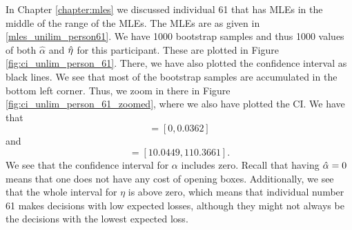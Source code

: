In Chapter \ref{chapter:mles} we discussed individual 61 that has MLEs in the middle of the range of the MLEs. The MLEs are as given in \eqref{mles_unilim_person61}.
We have 1000 bootstrap samples and thus 1000 values of both $\hat{\alpha}$ and $\hat{\eta}$ for this participant. These are plotted in Figure \ref{fig:ci_unlim_person_61}. There, we have also plotted the confidence interval as black lines. We see that most of the bootstrap samples are accumulated in the bottom left corner. Thus, we zoom in there in Figure \ref{fig:ci_unlim_person_61_zoomed}, where we also have plotted the CI. We have that
\begin{equation*}
    [\hat{\alpha}^{*(5)}_{1000},\hat{\alpha}^{*(95)}_{1000}] = [0,0.0362]
\end{equation*}
and
\begin{equation*}
    [\hat{\eta}^{*(5)}_{1000},\hat{\eta}^{*(95)}_{1000}] = [10.0449,110.3661].
\end{equation*}
We see that the confidence interval for $\alpha$ includes zero. Recall that having $\hat{\alpha}=0$ means that one does not have any cost of opening boxes. Additionally, we see that the whole interval for $\eta$ is above zero, which means that individual number 61 makes decisions with low expected losses, although they might not always be the decisions with the lowest expected loss. 


